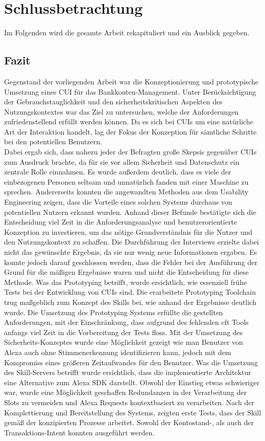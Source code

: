 \chapter{Schlussbetrachtung}
\label{cha:schlussbetrachtung}
Im Folgenden wird die gesamte Arbeit rekapituliert und ein Ausblick gegeben.

\section{Fazit}
\label{sec:fazit}
Gegenstand der vorliegenden Arbeit war die Konzeptionierung und prototypische Umsetzung eines \ac{CUI} für das Bankkonten-Management. Unter Berücksichtigung der Gebrauchstauglichkeit und den sicherheitskritischen Aspekten des Nutzungskontextes war das Ziel zu untersuchen, welche der Anforderungen zufriedenstellend erfüllt werden können. Da es sich bei \acp{CUI} um eine natürliche Art der Interaktion handelt, lag der Fokus der Konzeption für sämtliche Schritte bei den potentiellen Benutzern.\\ 
Dabei ergab sich, dass nahezu jeder der Befragten große Skepsis gegenüber \acp{CUI} zum Ausdruck brachte, da für sie vor allem Sicherheit und Datenschutz ein zentrale Rolle einnahmen. Es wurde außerdem deutlich, dass es viele der einbezogenen Personen seltsam und unnatürlich fanden mit einer Maschine zu sprechen. Andererseits konnten die angewandten Methoden aus dem Usability Engineering zeigen, dass die Vorteile eines solchen Systems durchaus von potentiellen Nutzern erkannt wurden. Anhand dieser Befunde bestätigte sich die Entscheidung viel Zeit in die Anforderungsanalyse und benutzerorientierte Konzeption zu investieren, um das nötige Grundverständnis für die Nutzer und den Nutzungskontext zu schaffen. Die Durchführung der Interviews erzielte dabei nicht das gewünschte Ergebnis, da sie nur wenig neue Informationen ergaben. Es konnte jedoch darauf geschlossen werden, dass die Fehler bei der Ausführung der Grund für die mäßigen Ergebnisse waren und nicht die Entscheidung für diese Methode. Was das Prototyping betrifft, wurde ersichtlich, wie essenziell frühe Tests bei der Entwicklung von \acp{CUI} sind. Die erarbeitete Prototyping Toolchain trug maßgeblich zum Konzept des Skills bei, wie anhand der Ergebnisse deutlich wurde. Die Umsetzung des Prototyping Systems erfüllte die gestellten Anforderungen, mit der Einschränkung, dass aufgrund des fehlenden \ac{cft} Tools anfangs viel Zeit in die Vorbereitung der Tests floss. Mit der Umsetzung des Sicherheits-Konzeptes wurde eine Möglichkeit gezeigt wie man Benutzer von Alexa auch ohne Stimmenerkennung identifizieren kann, jedoch mit dem Kompromiss eines größeren Zeitaufwandes für den Benutzer. Was die Umsetzung des Skill-Servers betrifft wurde ersichtlich, dass die implementierte Architektur eine Alternative zum Alexa \ac{SDK} darstellt. Obwohl der Einstieg etwas schwieriger war, wurde eine Möglichkeit geschaffen Redundanzen in der Verarbeitung der Slots zu vermeiden und Alexa Requests kontextbasiert zu verarbeiten. Nach der Komplettierung und Bereitstellung des Systems, zeigten erste Tests, dass der Skill gemäß der konzipierten Prozesse arbeitet. Sowohl der Kontostand-, als auch der Transaktions-Intent konnten ausgeführt werden.\\
